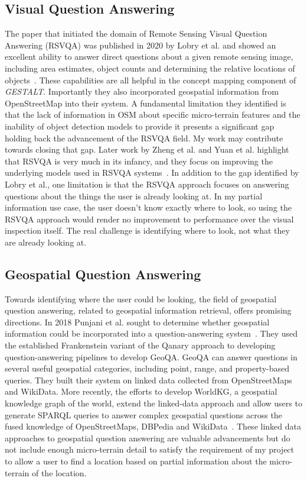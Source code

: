 \subsection{Visual Question Answering}
The paper that initiated the domain of Remote Sensing Visual Question Answering (RSVQA) was published in 2020 by Lobry et al. and showed an excellent ability to answer direct questions about a given remote sensing image, including area estimates, object counts and determining the relative locations of objects~\cite{Lobry2020}. 
These capabilities are all helpful in the concept mapping component of \textit{GESTALT}. Importantly they also incorporated geospatial information from OpenStreetMap into their system. 
A fundamental limitation they identified is that the lack of information in OSM about specific micro-terrain features and the inability of object detection models to provide it presents a significant gap holding back the advancement of the RSVQA field. 
My work may contribute towards closing that gap. Later work by Zheng et al. and Yuan et al. highlight that RSVQA is very much in its infancy, and they focus on improving the underlying models used in RSVQA systems~\cite{Zheng2021, Yuan2022}.
In addition to the gap identified by Lobry et al., one limitation is that the RSVQA approach focuses on answering questions about the things the user is already looking at. 
In my partial information use case, the user doesn't know exactly where to look, so using the RSVQA approach would render no improvement to performance over the visual inspection itself. 
The real challenge is identifying where to look, not what they are already looking at.

\subsection{Geospatial Question Answering}
 
Towards identifying where the user could be looking, the field of geospatial question answering, related to geospatial information retrieval, offers promising directions. 
In 2018 Punjani et al. sought to determine whether geospatial information could be incorporated into a question-answering system~\cite{Punjani2018}. 
They used the established Frankenstein variant of the Qanary approach to developing question-answering pipelines to develop GeoQA. 
GeoQA can answer questions in several useful geospatial categories, including point, range, and property-based queries. 
They built their system on linked data collected from OpenStreetMaps and WikiData. 
More recently, the efforts to develop WorldKG, a geospatial knowledge graph of the world, extend the linked-data approach and allow users to generate SPARQL queries to answer complex geospatial questions across the fused knowledge of OpenStreetMaps, DBPedia and WikiData~\cite{dsouza2021}. 
These linked data approaches to geospatial question answering are valuable advancements but do not include enough micro-terrain detail to satisfy the requirement of my project to allow a user to find a location based on partial information about the micro-terrain of the location.


